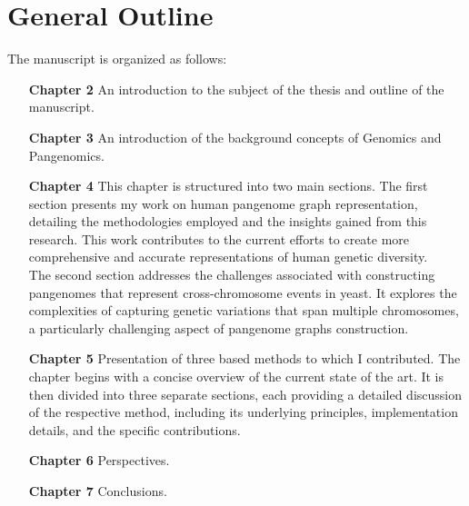 \section{General Outline}
The manuscript is organized as follows:
\begin{itemize}
	\item[\textbf{Chapter 2}] An introduction to the subject of the thesis and outline of the manuscript.
	\item[\textbf{Chapter 3}] An introduction of the background concepts of Genomics and Pangenomics.
	\item[\textbf{Chapter 4}] This chapter is structured into two main sections. The first section presents my work on human pangenome graph representation, detailing the methodologies employed and the insights gained from this research. This work contributes to the current efforts to create more comprehensive and accurate representations of human genetic diversity. \\The second section addresses the challenges associated with constructing pangenomes that represent cross-chromosome events in yeast. It explores the complexities of capturing genetic variations that span multiple chromosomes, a particularly challenging aspect of pangenome graphs construction.
	\item[\textbf{Chapter 5}] Presentation of three \kmer based methods to which I contributed. The chapter begins with a concise overview of the current state of the art. It is then divided into three separate sections, each providing a detailed discussion of the respective method, including its underlying principles, implementation details, and the specific contributions.
	\item[\textbf{Chapter 6}] Perspectives.
	\item[\textbf{Chapter 7}] Conclusions.
\end{itemize}

